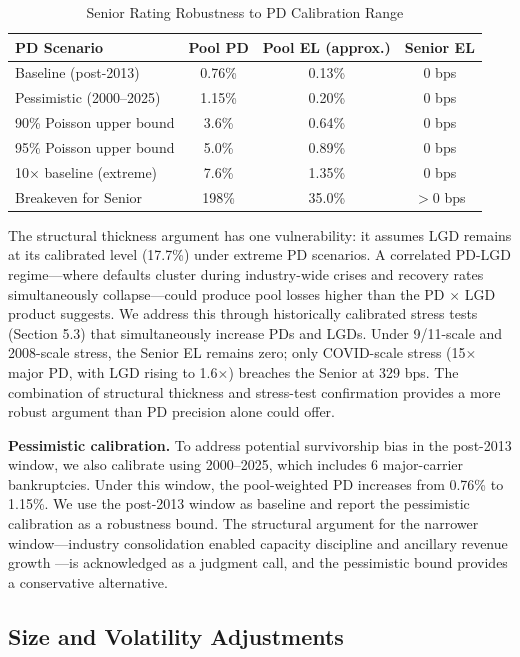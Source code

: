 \documentclass[12pt,a4paper]{article}
\begin{document}
\begin{table}[H]
\centering
\caption{Senior Rating Robustness to PD Calibration Range}
\label{tab:pd_robustness}
\begin{tabular}{lccc}
\toprule
\textbf{PD Scenario} & \textbf{Pool PD} & \textbf{Pool EL (approx.)} & \textbf{Senior EL} \\
\midrule
Baseline (post-2013)         & 0.76\% & 0.13\% & 0 bps \\
Pessimistic (2000--2025)     & 1.15\% & 0.20\% & 0 bps \\
90\% Poisson upper bound     & 3.6\%  & 0.64\% & 0 bps \\
95\% Poisson upper bound     & 5.0\%  & 0.89\% & 0 bps \\
10$\times$ baseline (extreme)& 7.6\%  & 1.35\% & 0 bps \\
Breakeven for Senior         & 198\%  & 35.0\% & $>$0 bps \\
\bottomrule
\end{tabular}
\end{table}

The structural thickness argument has one vulnerability: it assumes LGD remains at its calibrated level (17.7\%) under extreme PD scenarios. A correlated PD-LGD regime---where defaults cluster during industry-wide crises and recovery rates simultaneously collapse---could produce pool losses higher than the PD $\times$ LGD product suggests. We address this through historically calibrated stress tests (Section 5.3) that simultaneously increase PDs and LGDs. Under 9/11-scale and 2008-scale stress, the Senior EL remains zero; only COVID-scale stress (15$\times$ major PD, with LGD rising to 1.6$\times$) breaches the Senior at 329 bps. The combination of structural thickness and stress-test confirmation provides a more robust argument than PD precision alone could offer.

\textbf{Pessimistic calibration.} To address potential survivorship bias in the post-2013 window, we also calibrate using 2000--2025, which includes 6 major-carrier bankruptcies. Under this window, the pool-weighted PD increases from 0.76\% to 1.15\%. We use the post-2013 window as baseline and report the pessimistic calibration as a robustness bound. The structural argument for the narrower window---industry consolidation enabled capacity discipline and ancillary revenue growth \cite{borenstein2011}---is acknowledged as a judgment call, and the pessimistic bound provides a conservative alternative.

\subsection{Size and Volatility Adjustments}
\end{document}
